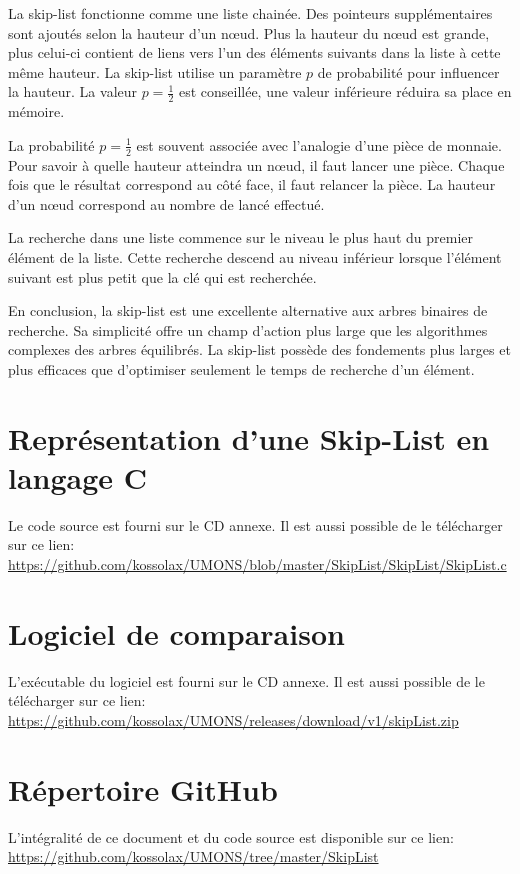 \documentclass[hidelinks,a4paper, 12pt]{article}
\begin{document}
	La skip-list fonctionne comme une liste chainée. Des pointeurs supplémentaires sont ajoutés selon la hauteur d'un nœud. Plus la hauteur du nœud est grande, plus celui-ci contient de liens vers l'un des éléments suivants dans la liste à cette même hauteur. La skip-list utilise un paramètre $p$ de probabilité pour influencer la hauteur. La valeur $p=\frac{1}{2}$ est conseillée, une valeur inférieure réduira sa place en mémoire.
	
	La probabilité $p=\frac{1}{2}$ est souvent associée avec l'analogie d'une pièce de monnaie. Pour savoir à quelle hauteur atteindra un nœud, il faut lancer une pièce. Chaque fois que le résultat correspond au côté face, il faut relancer la pièce. La hauteur d'un nœud correspond au nombre de lancé effectué.
	
	La recherche dans une liste commence sur le niveau le plus haut du premier élément de la liste. Cette recherche descend au niveau inférieur lorsque l'élément suivant est plus petit que la clé qui est recherchée.
	
	\vspace{1cm}
	En conclusion, la skip-list est une excellente alternative aux arbres binaires de recherche. Sa simplicité offre un champ d'action plus large que les algorithmes complexes des arbres équilibrés. La skip-list possède des fondements plus larges et plus efficaces que d'optimiser seulement le temps de recherche d'un élément.
	
	\nocite{1}
	\nocite{2}
	\nocite{3}
	\nocite{4}
	\nocite{5}
	\nocite{6}
	\nocite{7}
	
	
	
	\newpage
	\begin{appendices}
	\section{Représentation d'une Skip-List en langage C}
	Le code source est fourni sur le CD annexe. Il est aussi possible de le télécharger sur ce lien:
	\url{https://github.com/kossolax/UMONS/blob/master/SkipList/SkipList/SkipList.c}
	
	\section{Logiciel de comparaison}
	L'exécutable du logiciel est fourni sur le CD annexe. Il est aussi possible de le télécharger sur ce lien:
	\url{https://github.com/kossolax/UMONS/releases/download/v1/skipList.zip}
	
	\section{Répertoire GitHub}
	L'intégralité de ce document et du code source est disponible sur ce lien:
	\url{https://github.com/kossolax/UMONS/tree/master/SkipList}
	
	\end{appendices}
	
\end{document}

